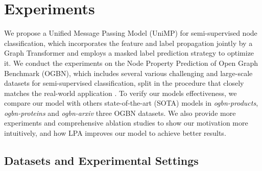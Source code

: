 \section{Experiments}

We propose a Unified Message Passing Model (UniMP) for semi-supervised node classification, which incorporates the feature and label propagation jointly by a Graph Transformer and employs a masked label prediction strategy to optimize it. We conduct the experiments on the Node Property Prediction of Open Graph Benchmark (OGBN), which includes several various challenging and large-scale datasets for semi-supervised classification, split in the procedure that closely matches the real-world application \cite{hu2020open}. To verify our models effectiveness, we compare our model with others state-of-the-art (SOTA) models in \emph{ogbn-products}, \emph{ogbn-proteins} and \emph{ogbn-arxiv} three OGBN datasets. We also provide more experiments and comprehensive ablation studies to show our motivation more intuitively, and how LPA improves our model to achieve better results.


\subsection{Datasets and Experimental Settings}





\begin{table}[htbp]
	\setlength{\abovecaptionskip}{-0cm}
	\begin{center}
	\end{center}
	\caption{Dataset statistics of OGB node property prediction}
	\label{table:ogb}
	\vspace{-4mm}
\end{table}

